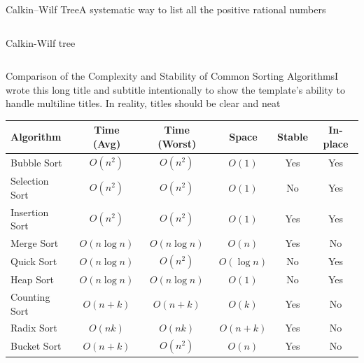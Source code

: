\documentclass[12pt, aspectratio=169]{beamer}
\begin{document}
\begin{frame}{Calkin–Wilf Tree}{A systematic way to list all the positive rational numbers}
\begin{columns}
\begin{column}{0.3\textwidth}
    Calkin-Wilf tree
    \end{column}
\end{columns}
\end{frame}

\begin{frame}{Comparison of the Complexity and Stability of Common Sorting Algorithms}{I wrote this long title and subtitle intentionally to show the template's ability to handle multiline titles. In reality, titles should be clear and neat}
\begin{table}[htbp]
\centering
\label{tab:sorting_detailed}
\small
\begin{tabular}{@{}lccccc@{}}
\toprule
\textbf{Algorithm} & \textbf{Time (Avg)} & \textbf{Time (Worst)} & \textbf{Space} & \textbf{Stable} & \textbf{In-place} \\
\midrule
Bubble Sort & $O(n^2)$ & $O(n^2)$ & $O(1)$ & Yes & Yes \\
Selection Sort & $O(n^2)$ & $O(n^2)$ & $O(1)$ & No & Yes \\
Insertion Sort & $O(n^2)$ & $O(n^2)$ & $O(1)$ & Yes & Yes \\
Merge Sort & $O(n \log n)$ & $O(n \log n)$ & $O(n)$ & Yes & No \\
Quick Sort & $O(n \log n)$ & $O(n^2)$ & $O(\log n)$ & No & Yes \\
Heap Sort & $O(n \log n)$ & $O(n \log n)$ & $O(1)$ & No & Yes \\
Counting Sort & $O(n+k)$ & $O(n+k)$ & $O(k)$ & Yes & No \\
Radix Sort & $O(nk)$ & $O(nk)$ & $O(n+k)$ & Yes & No \\
Bucket Sort & $O(n+k)$ & $O(n^2)$ & $O(n)$ & Yes & No \\
\bottomrule
\end{tabular}
\end{table}
\end{frame}
\end{document}
